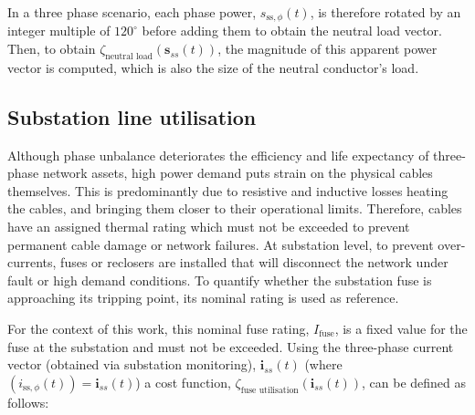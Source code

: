 

In a three phase scenario, each phase power, $s_{\text{ss},\phi}(t)$, is therefore rotated by an integer multiple of $120^\circ$ before adding them to obtain the neutral load vector.
Then, to obtain $\zeta_\text{neutral load}(\textbf{s}_{ss}(t))$, the magnitude of this apparent power vector is computed, which is also the size of the neutral conductor's load.

\subsection{Substation line utilisation}
\label{ch1:subsec:substation-line-utilisation}

Although phase unbalance deteriorates the efficiency and life expectancy of three-phase network assets, high power demand puts strain on the physical cables themselves.
This is predominantly due to resistive and inductive losses heating the cables, and bringing them closer to their operational limits.
Therefore, cables have an assigned thermal rating which must not be exceeded to prevent permanent cable damage or network failures.
At substation level, to prevent over-currents, fuses or reclosers are installed that will disconnect the network under fault or high demand conditions.
To quantify whether the substation fuse is approaching its tripping point, its nominal rating is used as reference.


For the context of this work, this nominal fuse rating, $I_\text{fuse}$, is a fixed value for the fuse at the substation and must not be exceeded.
Using the three-phase current vector (obtained via substation monitoring), $\textbf{i}_{ss}(t)$ (where $(i_{\text{ss},\phi}(t)) = \textbf{i}_{ss}(t)$) a cost function, $\zeta_\text{fuse utilisation}(\textbf{i}_{ss}(t))$, can be defined as follows:

